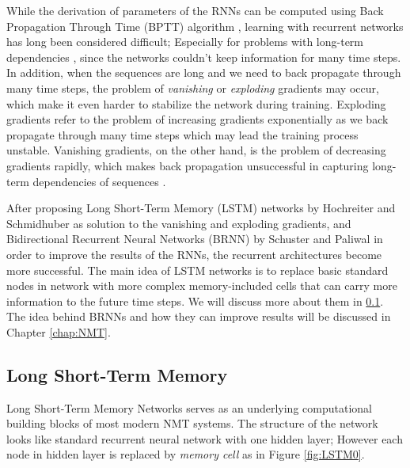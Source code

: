 \documentclass{sfuthesis}
\begin{document}
While the derivation of parameters of the RNNs can be computed using Back Propagation Through Time (BPTT) algorithm \cite{werbos:1990:IEEE}, learning with recurrent networks has long been considered difficult; Especially for problems with long-term dependencies \cite{Bengio:1994:LLD}, since the networks couldn't keep information for many time steps. In addition, when the sequences are long and we need to back propagate through many time steps, the problem of \textit{vanishing} or \textit{exploding} gradients may occur, which make it even harder to stabilize the network during training. Exploding gradients refer to the problem of increasing gradients exponentially as we back propagate through many time steps which may lead the training process unstable. Vanishing gradients, on the other hand, is the problem of decreasing gradients rapidly, which makes back propagation unsuccessful in capturing long-term dependencies of sequences \cite{Bengio:1994:LLD, Hochreiter:1997:LSM, martens:2011:ICML}.

After proposing Long Short-Term Memory (LSTM) networks by Hochreiter and Schmidhuber \cite{Hochreiter:1997:LSM} as solution to the vanishing and exploding gradients, and Bidirectional Recurrent Neural Networks (BRNN) by Schuster and Paliwal \cite{Schuster:1997:BRNN} in order to improve the results of the RNNs, the recurrent architectures become more successful. The main idea of LSTM networks is to replace basic standard nodes in network with more complex memory-included cells that can carry more information to the future time steps. We will discuss more about them in \ref{sub:LSTM}. The idea behind BRNNs and how they can improve results will be discussed in Chapter \ref{chap:NMT}.

\subsection{Long Short-Term Memory} \label{sub:LSTM}
Long Short-Term Memory Networks serves as an underlying computational building blocks of most modern NMT systems. The structure of the network looks like standard recurrent neural network with one hidden layer; However each node in hidden layer is replaced by \textit{memory cell} as in Figure \ref{fig:LSTM0}.
\end{document}
